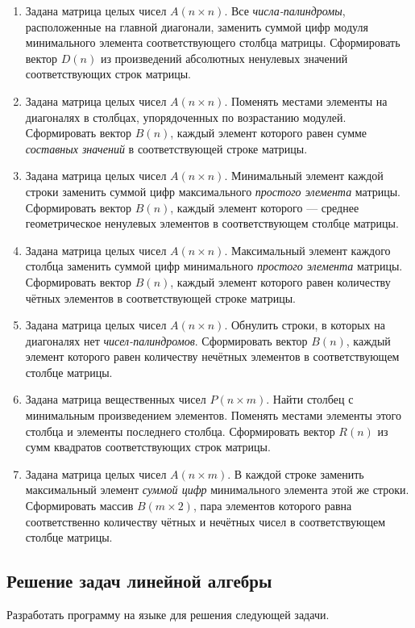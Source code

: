 \begin{enumerate}
\item Задана матрица целых чисел $A(n\times n)$. Все \emph{числа-палиндромы},
расположенные на главной диагонали, заменить суммой цифр модуля минимального элемента соответствующего столбца матрицы.
Сформировать вектор $D(n)$ из произведений абсолютных ненулевых значений соответствующих строк
матрицы.
\item Задана матрица целых чисел $A(n\times n)$. Поменять местами элементы на диагоналях в столбцах,
упорядоченных по возрастанию модулей. Сформировать вектор $B(n)$, каждый элемент которого
равен сумме \emph{составных значений} в соответствующей строке матрицы.
\item Задана матрица целых чисел $A(n\times n)$. Минимальный элемент каждой строки заменить суммой
цифр максимального \emph{простого элемента} матрицы. Сформировать вектор $B(n)$,
каждый элемент которого --- среднее геометрическое ненулевых элементов в соответствующем столбце матрицы.
\item Задана матрица целых чисел $A(n\times n)$. Максимальный элемент каждого столбца заменить суммой
цифр минимального \emph{простого элемента} матрицы. Сформировать вектор $B(n)$,
каждый элемент которого равен количеству чётных элементов в соответствующей строке матрицы.
\item Задана матрица целых чисел $A(n\times n)$. Обнулить строки, в которых на диагоналях нет
\emph{чисел-палиндромов}. Сформировать вектор $B(n)$, каждый
элемент которого равен количеству нечётных элементов в соответствующем столбце матрицы.
\item Задана матрица вещественных чисел $P(n\times m)$. Найти столбец с минимальным
произведением элементов. Поменять местами элементы этого столбца и элементы последнего столбца. Сформировать вектор
$R(n)$ из сумм квадратов соответствующих строк матрицы.
\item Задана матрица целых чисел $A(n\times m)$. В каждой строке заменить максимальный
элемент \emph{суммой цифр} минимального элемента этой же строки. Сформировать массив
$B(m\times 2)$, пара элементов которого равна соответственно количеству чётных и
нечётных чисел в соответствующем столбце матрицы.
\end{enumerate}

\subsection[Решение задач линейной алгебры]{Решение задач линейной алгебры}
Разработать программу на языке  для решения следующей задачи.

